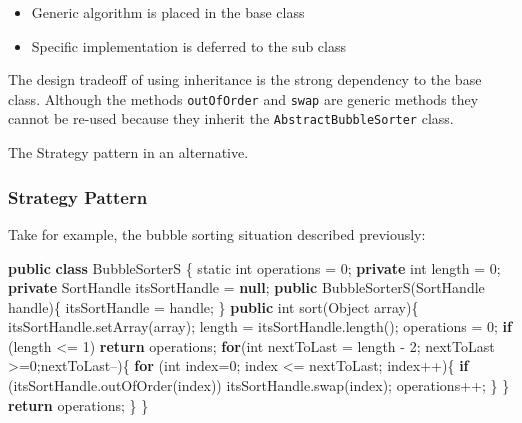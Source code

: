 \documentclass[]{article}
\newenvironment{Shaded}{}{}
\newcommand{\BuiltInTok}[1]{#1}
\newcommand{\DataTypeTok}[1]{\textcolor[rgb]{0.56,0.13,0.00}{#1}}
\newcommand{\DecValTok}[1]{\textcolor[rgb]{0.25,0.63,0.44}{#1}}
\newcommand{\FunctionTok}[1]{\textcolor[rgb]{0.02,0.16,0.49}{#1}}
\newcommand{\KeywordTok}[1]{\textcolor[rgb]{0.00,0.44,0.13}{\textbf{#1}}}
\newcommand{\NormalTok}[1]{#1}
\providecommand{\tightlist}{%
  \setlength{\itemsep}{0pt}\setlength{\parskip}{0pt}}
\begin{document}
\begin{itemize}
\tightlist
\item
  Generic algorithm is placed in the base class
\item
  Specific implementation is deferred to the sub class
\end{itemize}

The design tradeoff of using inheritance is the strong dependency to the
base class. Although the methods \texttt{outOfOrder} and \texttt{swap}
are generic methods they cannot be re-used because they inherit the
\texttt{AbstractBubbleSorter} class.

The Strategy pattern in an alternative.

\hypertarget{strategy-pattern}{%
\subsubsection{Strategy Pattern}\label{strategy-pattern}}

Take for example, the bubble sorting situation described previously:

\begin{Shaded}
\begin{Highlighting}[]
\KeywordTok{public} \KeywordTok{class}\NormalTok{ BubbleSorterS \{}
    \DataTypeTok{static} \DataTypeTok{int}\NormalTok{ operations = }\DecValTok{0}\NormalTok{;}
    \KeywordTok{private} \DataTypeTok{int}\NormalTok{ length = }\DecValTok{0}\NormalTok{;}
    \KeywordTok{private}\NormalTok{ SortHandle itsSortHandle = }\KeywordTok{null}\NormalTok{;}
    \KeywordTok{public} \FunctionTok{BubbleSorterS}\NormalTok{(SortHandle handle)\{}
\NormalTok{        itsSortHandle = handle;}
\NormalTok{    \}}
    \KeywordTok{public} \DataTypeTok{int} \FunctionTok{sort}\NormalTok{(}\BuiltInTok{Object}\NormalTok{ array)\{}
\NormalTok{        itsSortHandle.}\FunctionTok{setArray}\NormalTok{(array);}
\NormalTok{        length = itsSortHandle.}\FunctionTok{length}\NormalTok{();}
\NormalTok{        operations = }\DecValTok{0}\NormalTok{;}
        \KeywordTok{if}\NormalTok{ (length <= }\DecValTok{1}\NormalTok{)}
            \KeywordTok{return}\NormalTok{ operations;}
        \KeywordTok{for}\NormalTok{(}\DataTypeTok{int}\NormalTok{ nextToLast = length - }\DecValTok{2}\NormalTok{; nextToLast >=}\DecValTok{0}\NormalTok{;nextToLast--)\{}
            \KeywordTok{for}\NormalTok{ (}\DataTypeTok{int}\NormalTok{ index=}\DecValTok{0}\NormalTok{; index <= nextToLast; index++)\{}
                \KeywordTok{if}\NormalTok{ (itsSortHandle.}\FunctionTok{outOfOrder}\NormalTok{(index))}
\NormalTok{                    itsSortHandle.}\FunctionTok{swap}\NormalTok{(index);}
\NormalTok{                operations++;}
\NormalTok{            \}}
\NormalTok{        \}}
        \KeywordTok{return}\NormalTok{ operations;}
\NormalTok{    \}}
\NormalTok{\}}
\end{Highlighting}
\end{Shaded}
\end{document}
